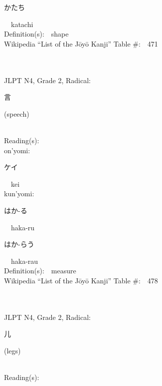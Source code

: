 \begin{multicols}{2}
{\hspace*{2em}}{\begin{CJK}{UTF8}{min} かたち \end{CJK}}\ \ katachi\ \ \\
Definition(s):\ \ shape \\
Wikipedia ``List of the J\=oy\=o Kanji'' Table \#:\ \ 471 \\
\ \ \\
{\fontsize{34pt}{40pt}  }\ \ \\  %
{JLPT N4, Grade 2, Radical:\ \ {\begin{CJK}{UTF8}{min} 言 \end{CJK}} (speech) } \\
Reading(s):\ \ \\
{\hspace*{1em}}on'yomi:\ \ \\
{\hspace*{2em}}{\begin{CJK}{UTF8}{min} ケイ \end{CJK}}\ \ kei\ \ \\
{\hspace*{1em}}kun'yomi:\ \ \\
{\hspace*{2em}}{\begin{CJK}{UTF8}{min} はか-る \end{CJK}}\ \ haka-ru\ \ \\
{\hspace*{2em}}{\begin{CJK}{UTF8}{min} はか-らう \end{CJK}}\ \ haka-rau\ \ \\
Definition(s):\ \ measure \\
Wikipedia ``List of the J\=oy\=o Kanji'' Table \#:\ \ 478 \\
\ \ \\
{\fontsize{34pt}{40pt}  }\ \ \\  %
{JLPT N4, Grade 2, Radical:\ \ {\begin{CJK}{UTF8}{min} 儿 \end{CJK}} (legs) } \\
Reading(s):\ \ \\

\end{multicols}
